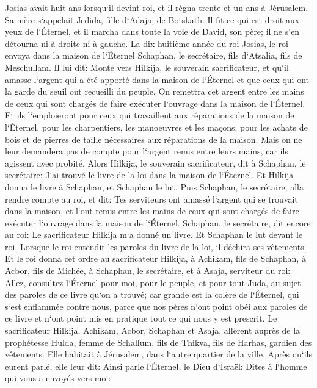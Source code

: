 \verse Josias avait huit ans lorsqu`il devint roi, et il régna trente et un ans à Jérusalem. Sa mère s`appelait Jedida, fille d`Adaja, de Botskath. 
\verse Il fit ce qui est droit aux yeux de l`Éternel, et il marcha dans toute la voie de David, son père; il ne s`en détourna ni à droite ni à gauche. 
\verse La dix-huitième année du roi Josias, le roi envoya dans la maison de l`Éternel Schaphan, le secrétaire, fils d`Atsalia, fils de Meschullam. 
\verse Il lui dit: Monte vers Hilkija, le souverain sacrificateur, et qu`il amasse l`argent qui a été apporté dans la maison de l`Éternel et que ceux qui ont la garde du seuil ont recueilli du peuple. 
\verse On remettra cet argent entre les mains de ceux qui sont chargés de faire exécuter l`ouvrage dans la maison de l`Éternel. Et ils l`emploieront pour ceux qui travaillent aux réparations de la maison de l`Éternel, 
\verse pour les charpentiers, les manoeuvres et les maçons, pour les achats de bois et de pierres de taille nécessaires aux réparations de la maison. 
\verse Mais on ne leur demandera pas de compte pour l`argent remis entre leurs mains, car ils agissent avec probité. 
\verse Alors Hilkija, le souverain sacrificateur, dit à Schaphan, le secrétaire: J`ai trouvé le livre de la loi dans la maison de l`Éternel. Et Hilkija donna le livre à Schaphan, et Schaphan le lut. 
\verse Puis Schaphan, le secrétaire, alla rendre compte au roi, et dit: Tes serviteurs ont amassé l`argent qui se trouvait dans la maison, et l`ont remis entre les mains de ceux qui sont chargés de faire exécuter l`ouvrage dans la maison de l`Éternel. 
\verse Schaphan, le secrétaire, dit encore au roi: Le sacrificateur Hilkija m`a donné un livre. Et Schaphan le lut devant le roi. 
\verse Lorsque le roi entendit les paroles du livre de la loi, il déchira ses vêtements. 
\verse Et le roi donna cet ordre au sacrificateur Hilkija, à Achikam, fils de Schaphan, à Acbor, fils de Michée, à Schaphan, le secrétaire, et à Asaja, serviteur du roi: 
\verse Allez, consultez l`Éternel pour moi, pour le peuple, et pour tout Juda, au sujet des paroles de ce livre qu`on a trouvé; car grande est la colère de l`Éternel, qui s`est enflammée contre nous, parce que nos pères n`ont point obéi aux paroles de ce livre et n`ont point mis en pratique tout ce qui nous y est prescrit. 
\verse Le sacrificateur Hilkija, Achikam, Acbor, Schaphan et Asaja, allèrent auprès de la prophétesse Hulda, femme de Schallum, fils de Thikva, fils de Harhas, gardien des vêtements. Elle habitait à Jérusalem, dans l`autre quartier de la ville. 
\verse Après qu`ils eurent parlé, elle leur dit: Ainsi parle l`Éternel, le Dieu d`Israël: Dites à l`homme qui vous a envoyés vers moi: 
